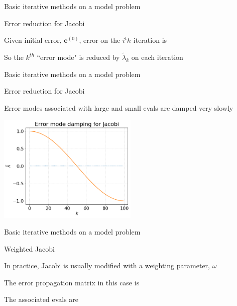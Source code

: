 \documentclass[18pt,xcolor=table]{beamer}
\begin{document}
\begin{frame}{Basic iterative methods on a model problem}
\begin{block}{Error reduction for Jacobi}
\bit
\item Given initial error, $\mathbf{e}^{(0)}$, error on the $i^th$ iteration is 
\item So the $k^{th}$ ``error mode" is reduced by $\tilde\lambda_k$ on each iteration
\eit
\end{block}
\end{frame}

\begin{frame}{Basic iterative methods on a model problem}
\begin{block}{Error reduction for Jacobi}
\bit
\item Error modes associated with large and small evals are damped very slowly
\eit
\end{block}
\begin{center}
\includegraphics[width=0.5\textwidth]{../figures/jacobiModeDamping}
\end{center}
\end{frame}

\begin{frame}{Basic iterative methods on a model problem}
\begin{block}{Weighted Jacobi}
\bit
\item In practice, Jacobi is usually modified with a weighting parameter, $\omega$
\item The error propagation matrix in this case is
\item The associated evals are
\eit
\end{block}
\end{frame}
\end{document}

